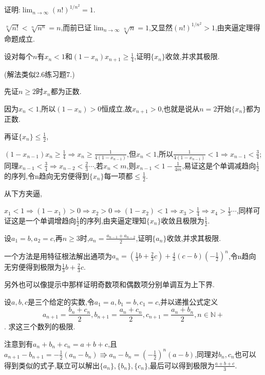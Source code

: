      \begin{exercise}
         证明:$\lim_{n\to\infty}(n!)^{1/n^2}=1$.
     \end{exercise}
     \begin{solution}
         $\sqrt[n]{n!}<\sqrt[n]{n^n}=n$,而前已证$\lim_{n\to\infty}\sqrt[n]{n}=1$,又显然$(n!)^{1/n^2}>1$,由夹逼定理得命题成立.
     \end{solution}

     \begin{exercise}
         设对每个$n$有$x_n<1$和$(1-x_n)x_{n+1}\geqslant\frac{1}{4}$,证明$\{x_n\}$收敛,并求其极限.
     \end{exercise}
     \begin{solution}
         (解法类似2.6练习题7.)

         先证$n\geqslant2$时$x_n$都为正数.

         因为$x_n<1$,所以$(1-x_n)>0$恒成立,故$x_{n+1}>0$,也就是说从$n=2$开始$\{x_n\}$都为正数.

         再证$\{x_n\}\leqslant\frac{1}{2}$,

         $(1-x_{n-1})x_n\geqslant\frac{1}{4}\Rightarrow x_n\geqslant\frac{1}{4(1-x_{n-1})}$,但$x_n<1$,所以$\frac{1}{4(1-x_{n-1})}<1\Rightarrow x_{n-1}<\frac{3}{4}$;同理$x_{n-1}<\frac{3}{4}\Rightarrow x_{n-2}<\frac{2}{3}\cdots$,若$x_n<m$,则$x_{n-1}<1-\frac{1}{4m}$,易证这是个单调减趋向$\frac{1}{2}$的序列,令n趋向无穷便得到$\{x_n\}$每一项都$\leqslant\frac{1}{2}$.

         从下方夹逼,

         $x_1<1\Rightarrow(1-x_1)>0\Rightarrow x_2>0\Rightarrow(1-x_2)<1\Rightarrow x_3>\frac{1}{4}\Rightarrow x_4>\frac{1}{3}\cdots$,同样可证这是一个单调增趋向$\frac{1}{2}$的序列,由夹逼定理知$\{x_n\}$收敛且极限为$\frac{1}{2}$.
     \end{solution}

     \begin{exercise}
         设$a_1=b,a_2=c$,再$n\geqslant3$时,$a_n=\frac{a_{n-1}+a_{n-2}}{2}$,证明$\{a_n\}$收敛,并求其极限.
     \end{exercise}
     \begin{solution}
         一个方法是用特征根法解出通项为$a_n=(\frac{1}{3}b+\frac{2}{3}c)+\frac{4}{3}(c-b)(-\frac{1}{2})^n$,令n趋向无穷便得到极限为$\frac{1}{3}b+\frac{2}{3}c$.

         另外也可以像提示中那样证明奇数项和偶数项分别单调互为上下界.
     \end{solution}

     \begin{exercise}
         设$a,b,c$是三个给定的实数,令$a_1=a,b_1=b,c_1=c$,并以递推公式定义
         \[
             a_{n+1}=\frac{b_n+c_n}{2},b_{n+1}=\frac{a_n+c_n}{2},c_{n+1}=\frac{a_n+b_n}{2},n\in \mathbb{N}+
         \]
         .
         求这三个数列的极限.
     \end{exercise}
     \begin{solution}
         注意到有$a_n+b_n+c_n=a+b+c$,且$a_{n+1}-b_{n+1}=-\frac{1}{2}(a_n-b_n)\Rrightarrow a_n-b_n=\left(-\frac{1}{2}\right)^n(a-b)$,同理对$b_n,c_n$也可以得到类似的式子,联立可以解出$\{a_n\},\{b_n\},\{c_n\}$,最后可以得到极限为$\frac{a+b+c}{3}$.
     \end{solution}

